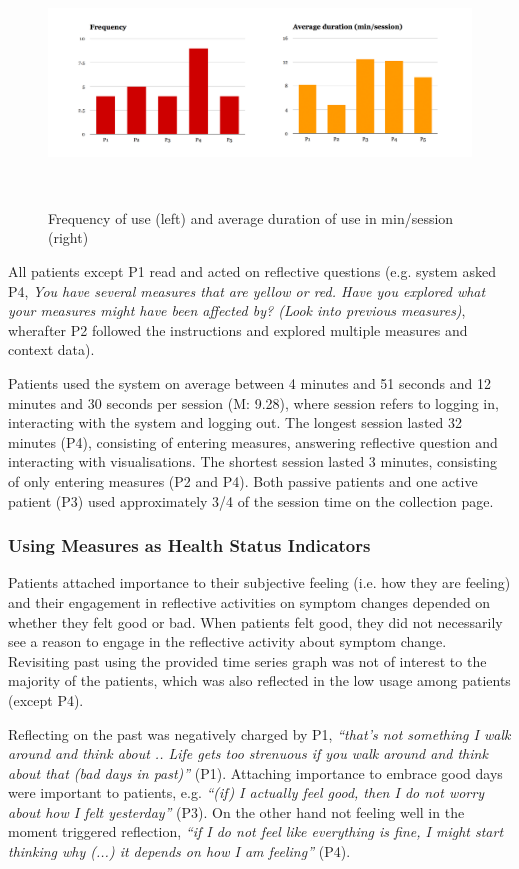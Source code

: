 \begin{figure}
 \centering
 \includegraphics[width=2.1\columnwidth]{img/charts}
 \caption{Frequency of use (left) and average duration of use in min/session (right)}~\label{charts}
\end{figure}

All patients except P1 read and acted on reflective questions (e.g. system asked P4, \textit{You have several measures that are yellow or red. Have you explored what your measures might have been affected by? (Look into previous measures)}, wherafter P2 followed the instructions and explored multiple measures and context data). 

Patients used the system on average between 4 minutes and 51 seconds and 12 minutes and 30 seconds per session (M: 9.28), where session refers to logging in, interacting with the system and logging out. The longest session lasted 32 minutes (P4), consisting of entering measures, answering reflective question and interacting with visualisations. The shortest session lasted 3 minutes, consisting of only entering measures (P2 and P4). Both passive patients and one active patient (P3) used approximately 3/4 of the session time on the collection page. 

\subsubsection{Using Measures as Health Status Indicators}
Patients attached importance to their subjective feeling (i.e. how they are feeling) and their engagement in reflective activities on symptom changes depended on whether they felt good or bad. When patients felt good, they did not necessarily see a reason to engage in the reflective activity about symptom change. Revisiting past using the provided time series graph was not of interest to the majority of the patients, which was also reflected in the low usage among patients (except P4). 

Reflecting on the past was negatively charged by P1, \textit{“that’s not something I walk around and think about .. Life gets too strenuous if you walk around and think about that (bad days in past)”} (P1). Attaching importance to embrace good days were important to patients, e.g. \textit{“(if) I actually feel good, then I do not worry about how I felt yesterday”} (P3). On the other hand not feeling well in the moment triggered reflection, \textit{“if I do not feel like everything is fine, I might start thinking why (...) it depends on how I am feeling”} (P4). 

